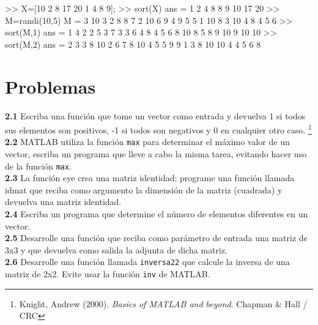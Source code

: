 \begin{matlab}
>> X=[10 2 8 17 20 1 4 8 9];
>> sort(X)
ans =
     1     2     4     8     8     9    10    17    20
>> M=randi(10,5)
M =
     3    10     3     2     8
     8     7     2    10     6
     9     4     9     5     5
     1    10     8     3    10
     4     8     4     5     6
>> sort(M,1) %
ans =
     1     4     2     2     5
     3     7     3     3     6
     4     8     4     5     6
     8    10     8     5     8
     9    10     9    10    10
>> sort(M,2) %
ans =
     2     3     3     8    10
     2     6     7     8    10
     4     5     5     9     9
     1     3     8    10    10
     4     4     5     6     8
\end{matlab}

\section{Problemas}\label{problemas}

\textbf{2.1} Escriba una función que tome un vector como entrada y
devuelva 1 si todos sus elementos son positivos, -1 si todos son
negativos y 0 en cualquier otro caso. \footnote{Knight, Andrew (2000).
  \emph{Basics of MATLAB and beyond}. Chapman \& Hall / CRC} \\

\textbf{2.2} MATLAB utiliza la función \texttt{max} para determinar el
máximo valor de un vector, escriba un programa que lleve a cabo la misma
tarea, evitando hacer uso de la función \texttt{max}. \\

\textbf{2.3} La función eye crea una matriz identidad; programe una
función llamada idmat que reciba como argumento la dimensión de la
matriz (cuadrada) y devuelva una matriz identidad. \\

\textbf{2.4} Escriba un programa que determine el número de elementos
diferentes en un vector. \\

\textbf{2.5} Desarrolle una función que reciba como parámetro de entrada
una matriz de 3x3 y que devuelva como salida la adjunta de dicha matriz. \\

\textbf{2.6} Desarrolle una función llamada \texttt{inversa22} que
calcule la inversa de una matriz de 2x2. Evite usar la función
\texttt{inv} de MATLAB.

